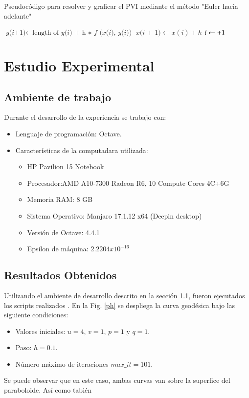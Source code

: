 \documentclass{endm}
\begin{document}
\begin{algorithm}
  \caption{Pseudoc\'odigo para resolver y graficar el PVI mediante el m\'etodo "Euler hacia adelante"}
    \label{pscod:euler}
  \begin{algorithmic}[1]
  \State $\textit{y(i+1)} \gets \text{length of }\textit{y(i) + h ∗ f (x(i), y(i))}$
  \State $\textit{x(i + 1)} \gets x(i) + h$ 
  \State$i\gets\relax+1$
   \EndWhile
  \end{algorithmic}
\end{algorithm}


%
\section{Estudio Experimental}\label{Resultados}
\subsection{Ambiente de trabajo}\label{ambiente}
Durante el desarrollo de la experiencia se trabajo con:
\begin{itemize}
    \item Lenguaje de programaci\'on: Octave.
    \item Caracter\'isticas de la computadara utilizada:
    \begin{itemize}
        \item HP Pavilion 15 Notebook
        \item Procesador:AMD A10-7300 Radeon R6, 10 Compute Cores 4C+6G
        \item Memoria RAM: 8 GB
        \item Sistema Operativo: Manjaro 17.1.12 x64 (Deepin desktop)
        \item Versión de Octave: 4.4.1
        \item Epsilon de m\'aquina: $2.2204x10^{-16}$
    \end{itemize}
\end{itemize}


\subsection{Resultados Obtenidos}
Utilizando el ambiente de desarrollo descrito en la secci\'on \ref{ambiente}, fueron ejecutados los scripts realizados \cite{scripts}.
En la Fig. \ref{ph} se despliega la curva geod\'esica bajo las siguiente condiciones:
\begin{itemize}
    \item Valores iniciales: $u=4$, $v=1$, $p=1$ y $q=1$.
    \item Paso: $h=0.1$.
    \item N\'umero m\'aximo de iteraciones $max\_it=101$.
\end{itemize}
Se puede observar que en este caso, ambas curvas van sobre la superfice del paraboloide. Así como tabi\'en 
\end{document}
